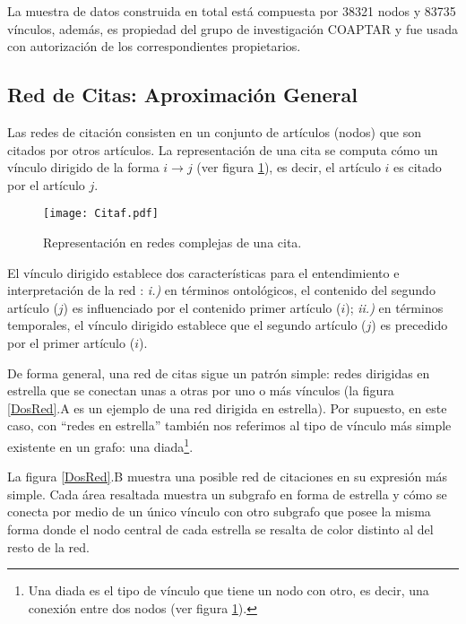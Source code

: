 \documentclass[12pt,letter]{article}
\begin{document}
\vspace{0.5cm}

La muestra de datos construida en total está compuesta por 38321 nodos y 83735 vínculos, además, es propiedad del grupo de investigación COAPTAR y fue usada con autorización de los correspondientes propietarios.


\subsection{Red de Citas: Aproximación General} \label{ApGe}

Las redes de citación consisten en un conjunto de artículos (nodos) que son citados por otros artículos. La representación de una cita se computa cómo un vínculo dirigido de la forma $i \rightarrow j$ (ver figura \ref{cita}), es decir, el artículo $i$ es citado por el artículo $j$.

\vspace{0.5cm}

\begin{figure}[h!]
\centering
\texttt{[image: Citaf.pdf]}
\caption{\small{Representación en redes complejas de una cita.}} \label{cita}
\end{figure}

\vspace{0.5cm}

El vínculo dirigido establece dos características para el entendimiento e interpretación de la red  \citep{Salazar1}: \emph{i.)} en términos ontológicos, el contenido del segundo artículo ($j$) es influenciado por el contenido primer artículo ($i$); \emph{ii.)} en términos temporales, el vínculo dirigido establece que el segundo artículo ($j$) es precedido por el primer artículo ($i$).

\vspace{0.5cm}

De forma general, una red de citas sigue un patrón simple: redes dirigidas en estrella que se conectan unas a otras por uno o más vínculos (la figura \ref{DosRed}.A es un ejemplo de una red dirigida en estrella). Por supuesto, en este caso, con ``redes en estrella'' también nos referimos al tipo de vínculo más simple existente en un grafo: una diada\footnote{Una diada es el tipo de vínculo que tiene un nodo con otro, es decir, una conexión entre dos nodos (ver figura \ref{cita}).}.

La figura \ref{DosRed}.B muestra una posible red de citaciones en su expresión más simple. Cada área resaltada muestra un subgrafo en forma de estrella y cómo se conecta por medio de un único vínculo con otro subgrafo que posee la misma forma donde el nodo central de cada estrella se resalta de color distinto al del resto de la red.
\end{document}
